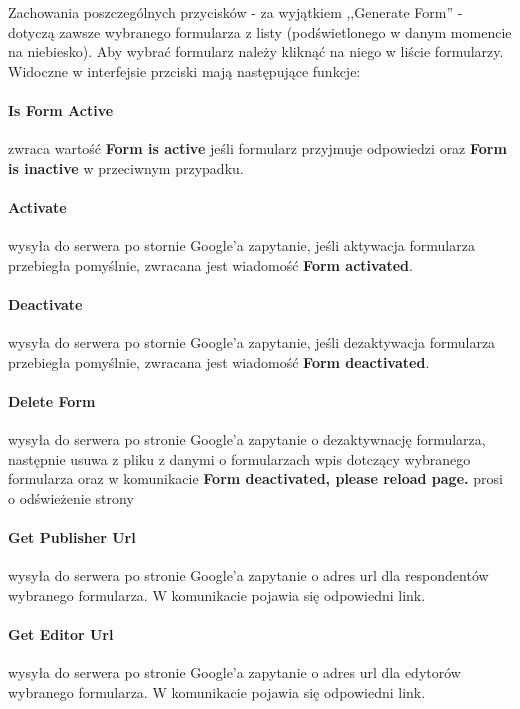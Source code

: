 \ind Zachowania poszczególnych przycisków  - za wyjątkiem ,,Generate Form'' - dotyczą zawsze wybranego formularza z listy (podświetlonego w danym momencie na niebiesko). Aby wybrać formularz należy kliknąć na niego w liście formularzy. 
\ind Widoczne w interfejsie przciski mają następujące funkcje:
\paragraph{Is Form Active} zwraca wartość \textbf{Form is active} jeśli formularz przyjmuje odpowiedzi oraz \textbf{Form is inactive} w przeciwnym przypadku.
\paragraph{Activate} wysyła do serwera po stornie Google'a zapytanie, jeśli aktywacja formularza przebiegła pomyślnie, zwracana jest wiadomość \textbf{Form activated}.
\paragraph{Deactivate} wysyła do serwera po stornie Google'a zapytanie, jeśli dezaktywacja formularza przebiegła pomyślnie, zwracana jest wiadomość \textbf{Form deactivated}.
\paragraph{Delete Form} wysyła do serwera po stronie Google'a zapytanie o dezaktywnację formularza, następnie usuwa z pliku z danymi o formularzach wpis dotczący wybranego formularza oraz w komunikacie \textbf{Form deactivated, please reload page.} prosi o odświeżenie strony
\paragraph{Get Publisher Url} wysyła do serwera po stronie Google'a zapytanie o adres url dla respondentów wybranego formularza. W komunikacie pojawia się odpowiedni link.
\paragraph{Get Editor Url} wysyła do serwera po stronie Google'a zapytanie o adres url dla edytorów wybranego formularza. W komunikacie pojawia się odpowiedni link.


